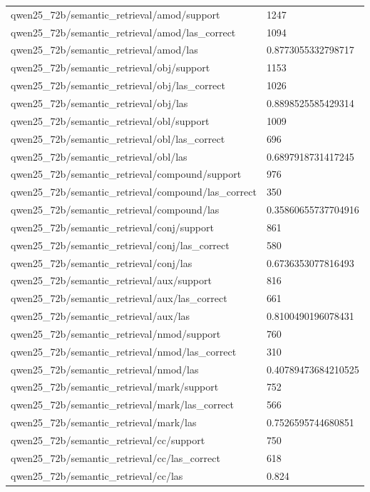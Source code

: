 \begin{tabular}{ll}
qwen25\_72b/semantic\_retrieval/amod/support & 1247 \\
qwen25\_72b/semantic\_retrieval/amod/las\_correct & 1094 \\
qwen25\_72b/semantic\_retrieval/amod/las & 0.8773055332798717 \\
qwen25\_72b/semantic\_retrieval/obj/support & 1153 \\
qwen25\_72b/semantic\_retrieval/obj/las\_correct & 1026 \\
qwen25\_72b/semantic\_retrieval/obj/las & 0.8898525585429314 \\
qwen25\_72b/semantic\_retrieval/obl/support & 1009 \\
qwen25\_72b/semantic\_retrieval/obl/las\_correct & 696 \\
qwen25\_72b/semantic\_retrieval/obl/las & 0.6897918731417245 \\
qwen25\_72b/semantic\_retrieval/compound/support & 976 \\
qwen25\_72b/semantic\_retrieval/compound/las\_correct & 350 \\
qwen25\_72b/semantic\_retrieval/compound/las & 0.35860655737704916 \\
qwen25\_72b/semantic\_retrieval/conj/support & 861 \\
qwen25\_72b/semantic\_retrieval/conj/las\_correct & 580 \\
qwen25\_72b/semantic\_retrieval/conj/las & 0.6736353077816493 \\
qwen25\_72b/semantic\_retrieval/aux/support & 816 \\
qwen25\_72b/semantic\_retrieval/aux/las\_correct & 661 \\
qwen25\_72b/semantic\_retrieval/aux/las & 0.8100490196078431 \\
qwen25\_72b/semantic\_retrieval/nmod/support & 760 \\
qwen25\_72b/semantic\_retrieval/nmod/las\_correct & 310 \\
qwen25\_72b/semantic\_retrieval/nmod/las & 0.40789473684210525 \\
qwen25\_72b/semantic\_retrieval/mark/support & 752 \\
qwen25\_72b/semantic\_retrieval/mark/las\_correct & 566 \\
qwen25\_72b/semantic\_retrieval/mark/las & 0.7526595744680851 \\
qwen25\_72b/semantic\_retrieval/cc/support & 750 \\
qwen25\_72b/semantic\_retrieval/cc/las\_correct & 618 \\
qwen25\_72b/semantic\_retrieval/cc/las & 0.824 \\

\end{tabular}

